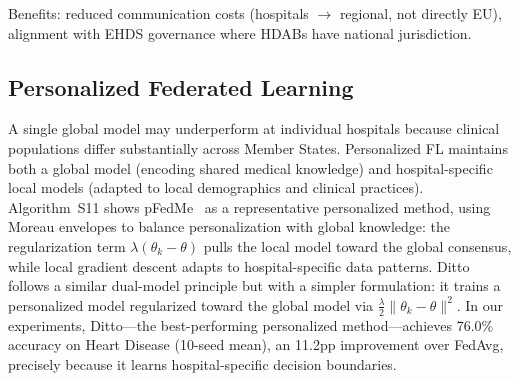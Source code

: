 \documentclass[conference]{IEEEtran}
\begin{document}
Benefits: reduced communication costs (hospitals $\to$ regional, not directly EU), alignment with EHDS governance where HDABs have national jurisdiction.

\subsection{Personalized Federated Learning}

A single global model may underperform at individual hospitals because clinical populations differ substantially across Member States. Personalized FL maintains both a global model (encoding shared medical knowledge) and hospital-specific local models (adapted to local demographics and clinical practices). Algorithm~S11 shows pFedMe~\cite{dinh2020pfedme} as a representative personalized method, using Moreau envelopes to balance personalization with global knowledge: the regularization term $\lambda(\theta_k - \theta)$ pulls the local model toward the global consensus, while local gradient descent adapts to hospital-specific data patterns. Ditto~\cite{li2021ditto} follows a similar dual-model principle but with a simpler formulation: it trains a personalized model regularized toward the global model via $\frac{\lambda}{2}\|\theta_k - \theta\|^2$. In our experiments, Ditto---the best-performing personalized method---achieves 76.0\% accuracy on Heart Disease (10-seed mean), an 11.2pp improvement over FedAvg, precisely because it learns hospital-specific decision boundaries.

\begin{figure}[htbp]
\centering
{}
\end{figure}
\end{document}
